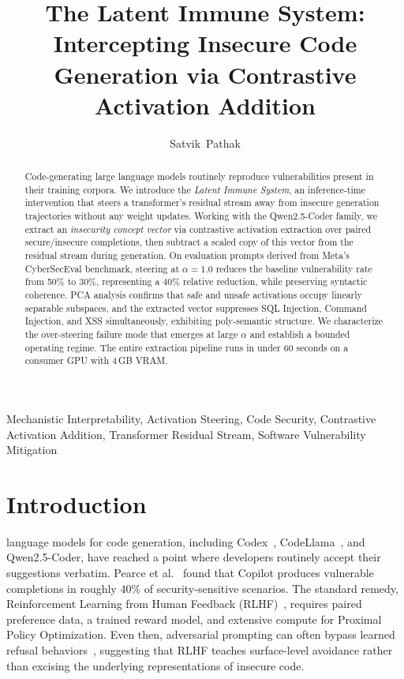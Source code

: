 \documentclass[journal, onecolumn]{IEEEtran}
\begin{document}
\title{The Latent Immune System: Intercepting Insecure Code Generation via Contrastive Activation Addition}

\author{Satvik~Pathak}


\maketitle

\begin{abstract}
Code-generating large language models routinely reproduce vulnerabilities present in their training corpora. We introduce the \textit{Latent Immune System}, an inference-time intervention that steers a transformer's residual stream away from insecure generation trajectories without any weight updates. Working with the Qwen2.5-Coder family, we extract an \textit{insecurity concept vector} via contrastive activation extraction over paired secure/insecure completions, then subtract a scaled copy of this vector from the residual stream during generation. On evaluation prompts derived from Meta's CyberSecEval benchmark, steering at $\alpha = 1.0$ reduces the baseline vulnerability rate from 50\% to 30\%, representing a 40\% relative reduction, while preserving syntactic coherence. PCA analysis confirms that safe and unsafe activations occupy linearly separable subspaces, and the extracted vector suppresses SQL Injection, Command Injection, and XSS simultaneously, exhibiting poly-semantic structure. We characterize the over-steering failure mode that emerges at large $\alpha$ and establish a bounded operating regime. The entire extraction pipeline runs in under 60 seconds on a consumer GPU with 4\,GB VRAM.
\end{abstract}

\begin{IEEEkeywords}
Mechanistic Interpretability, Activation Steering, Code Security, Contrastive Activation Addition, Transformer Residual Stream, Software Vulnerability Mitigation
\end{IEEEkeywords}

\section{Introduction}
 language models for code generation, including Codex~\cite{chen2021}, CodeLlama~\cite{roziere2023}, and Qwen2.5-Coder, have reached a point where developers routinely accept their suggestions verbatim. Pearce et al.~\cite{pearce2022} found that Copilot produces vulnerable completions in roughly 40\% of security-sensitive scenarios. The standard remedy, Reinforcement Learning from Human Feedback (RLHF)~\cite{ouyang2022}, requires paired preference data, a trained reward model, and extensive compute for Proximal Policy Optimization. Even then, adversarial prompting can often bypass learned refusal behaviors~\cite{zou2023}, suggesting that RLHF teaches surface-level avoidance rather than excising the underlying representations of insecure code.
\end{document}
